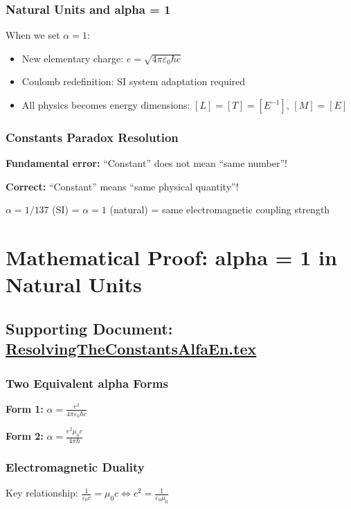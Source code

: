 \documentclass[12pt,a4paper]{report}
\begin{document}
	\subsubsection{Natural Units and alpha = 1}
	When we set $\alpha = 1$:
	\begin{itemize}
		\item New elementary charge: $e = \sqrt{4\pi \varepsilon_0 \hbar c}$
		\item Coulomb redefinition: SI system adaptation required
		\item All physics becomes energy dimensions: $[L] = [T] = [E^{-1}]$, $[M] = [E]$
	\end{itemize}
	
	\subsubsection{Constants Paradox Resolution}
	\textbf{Fundamental error:} ``Constant'' does not mean ``same number''!
	
	\textbf{Correct:} ``Constant'' means ``same physical quantity''!
	
	$\alpha = 1/137$ (SI) = $\alpha = 1$ (natural) = same electromagnetic coupling strength
	
	\section{Mathematical Proof: alpha = 1 in Natural Units}
	\subsection{Supporting Document: \href{https://github.com/jpascher/T0-Time-Mass-Duality/tree/main/2/pdf/ResolvingTheConstantsAlfaEn.pdf}{ResolvingTheConstantsAlfaEn.tex}}
	
	\subsubsection{Two Equivalent alpha Forms}
	\textbf{Form 1:} $\alpha = \frac{e^2}{4\pi \varepsilon_0 \hbar c}$
	
	\textbf{Form 2:} $\alpha = \frac{e^2 \mu_0 c}{4\pi \hbar}$
	
	\subsubsection{Electromagnetic Duality}
	Key relationship: $\frac{1}{\varepsilon_0 c} = \mu_0 c \Leftrightarrow c^2 = \frac{1}{\varepsilon_0 \mu_0}$
	
\end{document}
